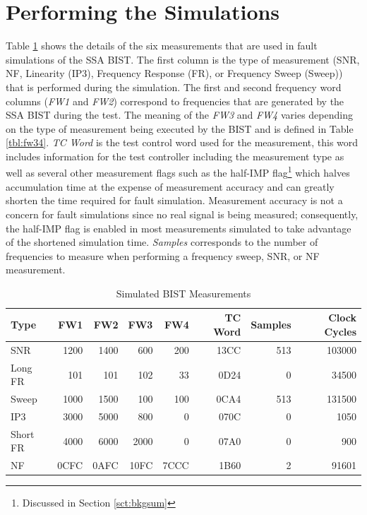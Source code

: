 \documentclass[12pt]{report}
\begin{document}
\section{Performing the Simulations}
Table \ref{tbl:faulttests} shows the details of the six measurements that are used in fault simulations of the SSA BIST.  The first column is the type of measurement (SNR, NF, Linearity (IP3), Frequency Response (FR), or Frequency Sweep (Sweep)) that is performed during the simulation.  The first and second frequency word columns (\textit{FW1} and \textit{FW2}) correspond to frequencies that are generated by the SSA BIST during the test.  The meaning of the \textit{FW3} and \textit{FW4} varies depending on the type of measurement being executed by the BIST and is defined in Table \ref{tbl:fw34}.  \textit{TC Word} is the test control word used for the measurement, this word includes information for the test controller including the measurement type as well as several other measurement flags such as the half-IMP flag\footnote{Discussed in Section \ref{sct:bkgsum}} which halves accumulation time at the expense of measurement accuracy and can greatly shorten the time required for fault simulation.  Measurement accuracy is not a concern for fault simulations since no real signal is being measured; consequently, the half-IMP flag is enabled in most measurements simulated to take advantage of the shortened simulation time.  \textit{Samples} corresponds to the number of frequencies to measure when performing a frequency sweep, SNR, or NF measurement.
\begin{table}
  \begin{center}
    \caption{Simulated BIST Measurements}
    \begin{tabular}{|l|r|r|r|r|r|r|r|}
      \hline
        Type & FW1 & FW2 & FW3 & FW4 & TC Word & Samples & Clock Cycles \\ \hline
        SNR & 1200 & 1400 & 600 & 200 & 13CC & 513 & 103000 \\ \hline
        Long FR & 101 & 101 & 102 & 33 & 0D24 & 0 & 34500 \\ \hline
        Sweep & 1000 & 1500 & 100 & 100 & 0CA4 & 513 & 131500\\ \hline
        IP3 & 3000 & 5000 & 800 & 0 & 070C & 0 & 1050 \\ \hline
        Short FR & 4000 & 6000 & 2000 & 0 & 07A0 & 0 & 900 \\ \hline
        NF & 0CFC & 0AFC & 10FC & 7CCC & 1B60 & 2 & 91601 \\
      \hline
    \end{tabular}
    \label{tbl:faulttests}
  \end{center}
\end{table}
\end{document}

